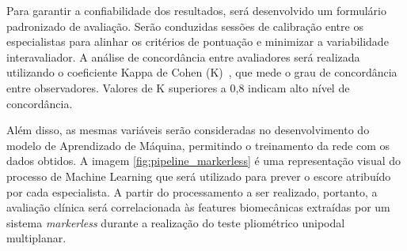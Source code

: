 \documentclass{article}
\begin{document}
Para garantir a confiabilidade dos resultados, será desenvolvido um formulário padronizado de avaliação. Serão conduzidas sessões de calibração entre os especialistas para alinhar os critérios de pontuação e minimizar a variabilidade interavaliador. A análise de concordância entre avaliadores será realizada utilizando o coeficiente Kappa de Cohen (K)~\cite{cohen1960}, que mede o grau de concordância entre observadores. Valores de K superiores a 0,8 indicam alto nível de concordância.

Além disso, as mesmas variáveis serão consideradas no desenvolvimento do modelo de Aprendizado de  Máquina, permitindo o treinamento da rede com os dados obtidos. A imagem \ref{fig:pipeline_markerless} é uma representação visual do processo de Machine Learning que será utilizado para prever o escore atribuído por cada especialista. A partir do processamento a ser realizado, portanto, a avaliação clínica será correlacionada às features biomecânicas extraídas por um sistema \textit{markerless} durante a realização do teste pliométrico unipodal multiplanar.


\end{document}
